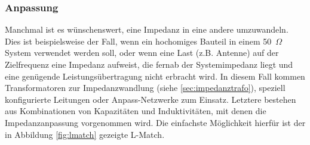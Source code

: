 \documentclass[twoside,a4paper,11pt,halfparskip,DIV=11,notitlepage]{scrartcl}
\begin{document}
\subsubsection{Anpassung}
Manchmal ist es wünschenswert, eine Impedanz in eine andere umzuwandeln. Dies ist beispielsweise der Fall,
wenn ein hochomiges Bauteil in einem 50~$\Omega$ System verwendet werden soll, oder wenn eine Last
(z.B. Antenne) auf der Zielfrequenz eine Impedanz aufweist, die fernab der Systemimpedanz liegt und eine
genügende Leistungsübertragung nicht erbracht wird. In diesem Fall kommen Transformatoren zur Impedanzwandlung
(siehe \ref{sec:impedanztrafo}), speziell konfigurierte Leitungen 
oder Anpass-Netzwerke zum Einsatz. Letztere bestehen aus Kombinationen von Kapazitäten und Induktivitäten,
mit denen die Impedanzanpassung vorgenommen wird. Die einfachste Möglichkeit hierfür ist der in Abbildung
\ref{fig:lmatch} gezeigte L-Match.
\end{document}
